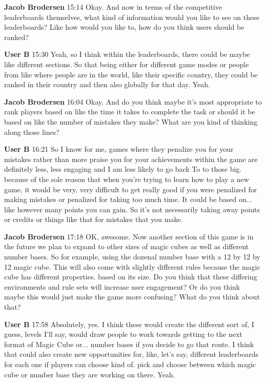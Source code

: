 \documentclass{article}
\begin{document}
\noindent \textbf{Jacob Brodersen}   15:14
Okay.
And now in terms of the competitive leaderboards themselves, what kind of information would you like to see on these leaderboards? Like how would you like to, how do you think users should be ranked?

\noindent \textbf{User B}   15:30
Yeah, so I think within the leaderboards, there could be maybe like different sections. So that being either for different game modes or people from like where people are in the world, like their specific
country, they could be ranked in their country and then also globally for that day.
Yeah.

\noindent \textbf{Jacob Brodersen}   16:04
Okay. And do you think maybe it's most appropriate to rank players based on like the time it takes to complete the task or should it be based on like the number of mistakes they make? What are you kind of thinking along those lines?

\noindent \textbf{User B}   16:21
So I know for me, games where they penalize you for your mistakes rather than more praise you for your achievements within the game are definitely less, less engaging and I am less likely to go back
To to those big.
because of the sole reason that when you're trying to learn how to play a new game, it would be very, very difficult to get really good if you were penalized for making mistakes or penalized for taking too much time. It could be based on...
like however many points you can gain. So it's not necessarily taking away points or credits or things like that for mistakes that you make.

\noindent \textbf{Jacob Brodersen}   17:18
OK, awesome.
Now another section of this game is in the future we plan to expand to other sizes of magic cubes as well as different number bases. So for example, using the dozenal number base with a 12 by 12 by 12 magic cube. This will also come with slightly different rules because the magic cube has different properties.
based on its size. Do you think that these differing environments and rule sets will increase user engagement? Or do you think maybe this would just make the game more confusing? What do you think about that?

\noindent \textbf{User B}   17:58
Absolutely, yes. I think these would create the different sort of, I guess, levels I'll say, would draw people to work towards getting to the next format of Magic Cube or...
number bases if you decide to go that route. I think that could also create new opportunities for, like, let's say, different leaderboards for each one if players can choose kind of.
pick and choose between which magic cube or number base they are working on there. Yeah.
\end{document}
